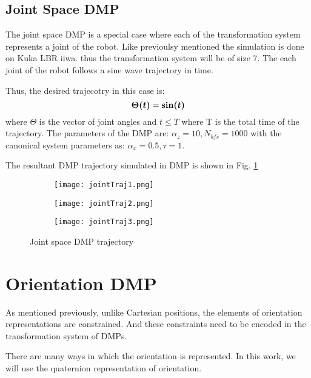 \subsection{Joint Space DMP}
The joint space DMP is a special case where each of the transformation system represents a joint of the robot.
Like previoulsy mentioned the simulation is done on Kuka LBR iiwa. thus the transformation system will be of size 7.
The each joint of the robot follows a sine wave trajectory in time. 

Thus, the desired trajecotry in this case is:
\begin{equation}
    \boldsymbol{\Theta(t)} = \boldsymbol{\sin(t)} 
\end{equation}
where $\Theta$ is the vector of joint angles and $t \leq T$ where T is the total time of the trajectory.
The parameters of the DMP are: $\alpha_z = 10, N_{bfs} = 1000$ with the canonical system parameters as: 
$\alpha_x = 0.5, \tau = 1$.

The resultant DMP trajectory simulated in DMP is shown in Fig. \ref{fig:joint_traj_pybullet}

\begin{figure}[h]
    \centering
    \begin{subfigure}{0.3\textwidth}
        \texttt{[image: jointTraj1.png]}
    \end{subfigure}%
    \begin{subfigure}{0.3\textwidth}
        \texttt{[image: jointTraj2.png]}
    \end{subfigure}%
    \begin{subfigure}{0.3\textwidth}
        \texttt{[image: jointTraj3.png]}
    \end{subfigure}%
    \caption{Joint space DMP trajectory}
    \label{fig:joint_traj_pybullet}

\end{figure}

\section{Orientation DMP}
As mentioned previously, unlike Cartesian positions, the elements of orientation representations are constrained.
And these constraints need to be encoded in the transformation system of DMPs.

There are many ways in which the orientation is represented. In this work, we will use the quaternion representation of orientation\cite{quaternionDMP}.

